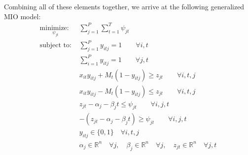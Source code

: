 Combining all of these elements together, we arrive at the following generalized MIO model:
\begin{align}
\underset{\psi_{jt}}{\text{minimize: }} & \sum_{j=1}^{P} \sum_{t=1}^{T} \psi_{jt} \label{eq:Basic_Problem}\\
\text{subject to: }	& \sum_{j=1}^{P} y_{itj} = 1 \qquad \forall i,t\nonumber\\
				& \sum_{i=1}^{P} y_{itj} = 1 \qquad \forall j,t\nonumber\\
				& x_{it}y_{itj} + M_{t}(1-y_{itj}) \geq z_{jt} \qquad \forall i,t,j\nonumber\\
				& x_{it}y_{itj} - M_{t}(1-y_{itj}) \leq z_{jt} \qquad \forall i,t,j\nonumber\\
				& z_{jt} - \alpha_{j} - \beta_{j}t \leq \psi_{jt} \qquad \forall i,j,t\nonumber\\
				& -(z_{jt} - \alpha_{j} - \beta_{j}t) \geq \psi_{jt} \qquad \forall i,j,t\nonumber\\
			 	& y_{itj} \in \{0,1\} \quad \forall i,t,j\nonumber\\
				& \alpha_{j} \in \mathbb{R}^n \quad \forall j,\quad \beta_{j} \in \mathbb{R}^n \quad \forall j, \quad z_{jt} \in \mathbb{R}^n \quad \forall j,t\nonumber
\end{align}
